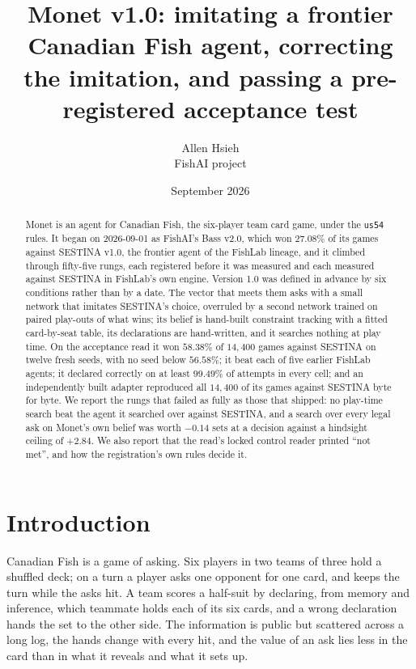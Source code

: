 \documentclass[11pt]{article}
\title{Monet v1.0: imitating a frontier Canadian Fish agent, correcting the imitation, and passing a
pre-registered acceptance test}
\author{Allen Hsieh\\[2pt] {\small FishAI project}}
\date{September 2026}
\newcommand{\code}[1]{\texttt{#1}}
\newcommand{\usff}{\code{us54}}
\begin{document}
\maketitle

\begin{abstract}
\noindent Monet is an agent for Canadian Fish, the six-player team card game, under the \usff{} rules.
It began on 2026-09-01 as FishAI's Bass v2.0, which won $27.08\%$ of its games against SESTINA v1.0,
the frontier agent of the FishLab lineage, and it climbed through fifty-five rungs, each registered
before it was measured and each measured against SESTINA in FishLab's own engine. Version 1.0 was
defined in advance by six conditions rather than by a date. The vector that meets them asks with a
small network that imitates SESTINA's choice, overruled by a second network trained on paired
play-outs of what wins; its belief is hand-built constraint tracking with a fitted card-by-seat table,
its declarations are hand-written, and it searches nothing at play time. On the acceptance read it won
$58.38\%$ of $14{,}400$ games against SESTINA on twelve fresh seeds, with no seed below $56.58\%$; it
beat each of five earlier FishLab agents; it declared correctly on at least $99.49\%$ of attempts in
every cell; and an independently built adapter reproduced all $14{,}400$ of its games against SESTINA byte for byte. We report the rungs that failed as fully as those that shipped: no
play-time search beat the agent it searched over against SESTINA, and a search over every legal ask on
Monet's own belief was worth $-0.14$ sets at a decision against a hindsight ceiling of $+2.84$. We also
report that the read's locked control reader printed ``not met'', and how the registration's own rules
decide it.
\end{abstract}

\section{Introduction}
\label{sec:intro}

Canadian Fish is a game of asking. Six players in two teams of three hold a shuffled deck; on a turn a
player asks one opponent for one card, and keeps the turn while the asks hit. A team scores a
half-suit by declaring, from memory and inference, which teammate holds each of its six cards, and a
wrong declaration hands the set to the other side. The information is public but scattered across a
long log, the hands change with every hit, and the value of an ask lies less in the card than in what
it reveals and what it sets up.
\end{document}
